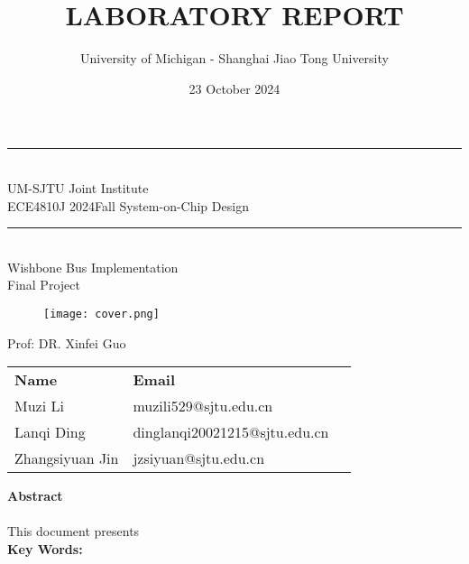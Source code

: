 \documentclass[12pt]{report}
\title{LABORATORY REPORT }
\author{University of Michigan - Shanghai Jiao Tong University}
\date{23 October 2024}
\begin{document}
{\centering
\scshape{
\rule[-3pt]{16.5cm}{0.01mm}\\
\vspace{0.5cm}
\large UM-SJTU Joint Institute
\vspace{0.2cm}
\\ECE4810J 2024Fall System-on-Chip Design
\rule[3pt]{16.5cm}{0.01mm}\\
\vspace{0.2cm}
{\LARGE{Wishbone Bus Implementation}}\\
\vspace{0.2cm}
{\Large{Final Project}}\\


\begin{figure}[H]
    \centering
    \texttt{[image: cover.png]}
    \label{fig:cover}
\end{figure}


\vspace{0.5cm}
Prof: DR. Xinfei Guo\\
}}
\vspace{0.3cm}


\vspace{0.5cm}

\begin{table}[h]
    \centering
    \begin{tabular}{l l l}
        \textbf{Name} & \textbf{Email} \\
         Muzi Li & muzili529@sjtu.edu.cn \\
         Lanqi Ding & dinglanqi20021215@sjtu.edu.cn \\
         Zhangsiyuan Jin & jzsiyuan@sjtu.edu.cn
    \end{tabular}
\end{table}

\newpage
\noindent
{\Large{\textbf{Abstract}}}
\\ \hspace*{\fill} \\


This document presents 
\\

\noindent
\textbf{Key Words: }




\newpage

\doublespacing
\tableofcontents	%
\thispagestyle{empty}
\clearpage
\end{document}
